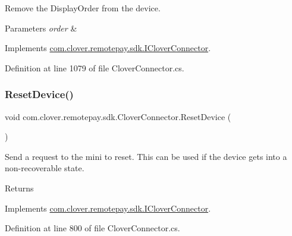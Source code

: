 Remove the Display\+Order from the device. 


\begin{DoxyParams}{Parameters}
{\em order} & \\
\hline
\end{DoxyParams}


Implements \hyperlink{interfacecom_1_1clover_1_1remotepay_1_1sdk_1_1_i_clover_connector_a55ebe329c852bedccaeb882ca71c4774}{com.\+clover.\+remotepay.\+sdk.\+I\+Clover\+Connector}.



Definition at line 1079 of file Clover\+Connector.\+cs.

\mbox{\label{classcom_1_1clover_1_1remotepay_1_1sdk_1_1_clover_connector_a422575429ff010ed302c57eb5542c35f}} 
\subsubsection{\texorpdfstring{Reset\+Device()}{ResetDevice()}}
{\footnotesize\ttfamily void com.\+clover.\+remotepay.\+sdk.\+Clover\+Connector.\+Reset\+Device (\begin{DoxyParamCaption}{ }\end{DoxyParamCaption})}



Send a request to the mini to reset. This can be used if the device gets into a non-\/recoverable state. 

\begin{DoxyReturn}{Returns}

\end{DoxyReturn}


Implements \hyperlink{interfacecom_1_1clover_1_1remotepay_1_1sdk_1_1_i_clover_connector_aafead472d6f0adc74084a229bf75e5ed}{com.\+clover.\+remotepay.\+sdk.\+I\+Clover\+Connector}.



Definition at line 800 of file Clover\+Connector.\+cs.

\mbox{\label{classcom_1_1clover_1_1remotepay_1_1sdk_1_1_clover_connector_a7a5404c24cac6be283c80a7983bfa4eb}} 
